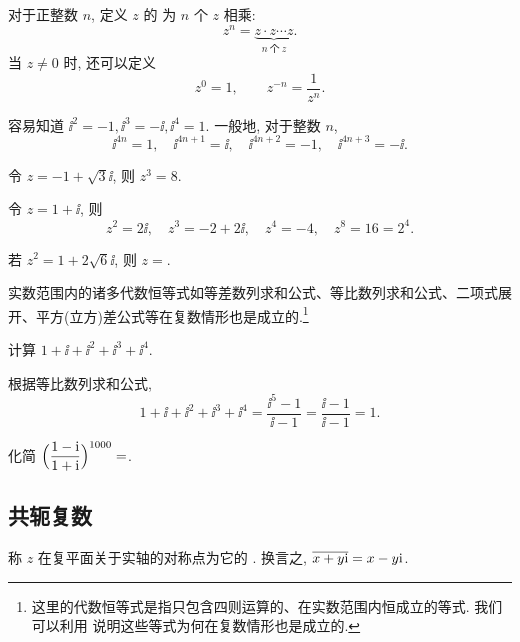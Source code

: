 对于正整数 $n$, 定义 $z$ 的 为 $n$ 个 $z$ 相乘:
\[
  z^n=\underbrace{z\cdot z\cdots z}_{n\ \text{个}\ z}.
\]
当 $z\neq 0$ 时, 还可以定义
\[
  z^0=1,\qquad
  z^{-n}=\frac1{z^n}.
\]

\begin{exampleenum}
  \item 容易知道 $\ii^2=-1,\ii^3=-\ii,\ii^4=1$.
  一般地, 对于整数 $n$, 
  \[
    \ii^{4n}=1,\quad 
    \ii^{4n+1}=\ii,\quad 
    \ii^{4n+2}=-1,\quad 
    \ii^{4n+3}=-\ii.
  \]
  \item 令 $z=-1+\sqrt 3\ii$, 则 $z^3=8$.
  \item 令 $z=1+\ii$, 则
  \[
    z^2=2\ii,\quad 
    z^3=-2+2\ii,\quad 
    z^4=-4,\quad 
    z^8=16=2^4.
  \]
\end{exampleenum}

\begin{exercise}
  若 $z^2=1+2\sqrt6\ii$, 则 $z=$\fillblank{}.
\end{exercise}

实数范围内的诸多代数恒等式如等差数列求和公式、等比数列求和公式、二项式展开、平方(立方)差公式等在复数情形也是成立的.\footnote{
  这里的代数恒等式是指只包含四则运算的、在实数范围内恒成立的等式.
  我们可以利用 说明这些等式为何在复数情形也是成立的.
}

\begin{example}
  计算 $1+\ii+\ii^2+\ii^3+\ii^4$.
\end{example}

\begin{solution}
  根据等比数列求和公式,
  \[
     1+\ii+\ii^2+\ii^3+\ii^4
    =\frac{\ii^5-1}{\ii-1}
    =\frac{\ii-1}{\ii-1}
    =1.
  \]
\end{solution}

\begin{exercise}
  化简 $\Bigl(\dfrac{1-\mathrm{i}}{1+\mathrm{i}}\Bigr)^{1000}=$\fillblank{}.
\end{exercise}


\subsection{共轭复数}

\begin{definition}
  称 $z$ 在复平面关于实轴的对称点为它的 .
  换言之, $\overline{x+y\mathrm{i}}=x-y\mathrm{i}$.
\end{definition}

